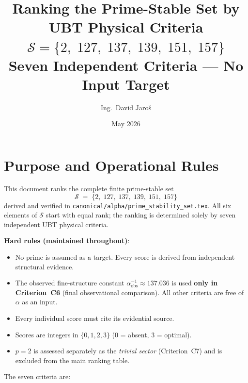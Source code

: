 \documentclass[12pt,a4paper]{article}
\title{\textbf{Ranking the Prime-Stable Set by UBT Physical Criteria}\\[6pt]
         \large $\mathcal{S} = \{2,\;127,\;137,\;139,\;151,\;157\}$\\
         Seven Independent Criteria — No Input Target}
\author{Ing.\ David Jaro\v{s}}
\date{May 2026}
\theoremstyle{definition}
\theoremstyle{remark}
\begin{document}
  \maketitle
  \tableofcontents
  \newpage
\fi

\section{Purpose and Operational Rules}
\label{sec:spr:purpose}

This document ranks the complete finite prime-stable set
\[
  \mathcal{S} \;=\; \{2,\;127,\;137,\;139,\;151,\;157\}
\]
derived and verified in \texttt{canonical/alpha/prime\_stability\_set.tex}.
All six elements of $\mathcal{S}$ start with equal rank; the ranking is
determined solely by seven independent UBT physical criteria.

\begin{warnbox}
\textbf{Hard rules (maintained throughout)}:
\begin{itemize}
  \item No prime is assumed as a target.  Every score is derived from
        independent structural evidence.
  \item The observed fine-structure constant $\alpha^{-1}_{\mathrm{obs}}
        \approx 137.036$ is used \textbf{only in Criterion~C6} (final
        observational comparison).  All other criteria are free of $\alpha$
        as an input.
  \item Every individual score must cite its evidential source.
  \item Scores are integers in $\{0,1,2,3\}$ (0 = absent, 3 = optimal).
  \item $p = 2$ is assessed separately as the \emph{trivial sector}
        (Criterion~C7) and is excluded from the main ranking table.
\end{itemize}
\end{warnbox}

The seven criteria are:
\end{document}
